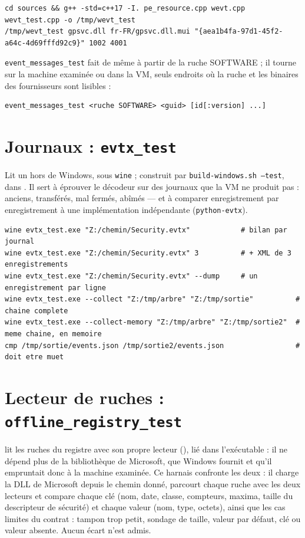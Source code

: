 \documentclass[11pt,a4paper,oneside]{report}
\begin{document}
\begin{lstlisting}
cd sources && g++ -std=c++17 -I. pe_resource.cpp wevt.cpp wevt_test.cpp -o /tmp/wevt_test
/tmp/wevt_test gpsvc.dll fr-FR/gpsvc.dll.mui "{aea1b4fa-97d1-45f2-a64c-4d69fffd92c9}" 1002 4001
\end{lstlisting}

\texttt{event\_messages\_test} fait de même à partir de la ruche SOFTWARE ; il
tourne sur la machine examinée ou dans la VM, seuls endroits où la ruche et les
binaires des fournisseurs sont lisibles :

\begin{lstlisting}
event_messages_test <ruche SOFTWARE> <guid> [id[:version] ...]
\end{lstlisting}

\section{Journaux : \texttt{evtx\_test}}

Lit un  hors de Windows, sous \texttt{wine} ; construit par
\texttt{build-windows.sh --test}, dans . Il sert à éprouver
le décodeur sur des journaux que la VM ne produit pas : anciens, transférés,
mal fermés, abîmés — et à comparer enregistrement par enregistrement à une
implémentation indépendante (\texttt{python-evtx}).

\begin{lstlisting}
wine evtx_test.exe "Z:/chemin/Security.evtx"            # bilan par journal
wine evtx_test.exe "Z:/chemin/Security.evtx" 3          # + XML de 3 enregistrements
wine evtx_test.exe "Z:/chemin/Security.evtx" --dump     # un enregistrement par ligne
wine evtx_test.exe --collect "Z:/tmp/arbre" "Z:/tmp/sortie"          # chaine complete
wine evtx_test.exe --collect-memory "Z:/tmp/arbre" "Z:/tmp/sortie2"  # meme chaine, en memoire
cmp /tmp/sortie/events.json /tmp/sortie2/events.json                 # doit etre muet
\end{lstlisting}


\section{Lecteur de ruches : \texttt{offline\_registry\_test}}

\wac{} lit les ruches du registre avec son propre lecteur
(), lié dans l'exécutable : il ne dépend plus
de la bibliothèque  de Microsoft, que Windows fournit et
qu'il empruntait donc à la machine examinée. Ce harnais confronte les deux :
il charge la DLL de Microsoft depuis le chemin donné, parcourt chaque ruche
avec les deux lecteurs et compare chaque clé (nom, date, classe, compteurs,
maxima, taille du descripteur de sécurité) et chaque valeur (nom, type,
octets), ainsi que les cas limites du contrat : tampon trop petit, sondage de
taille, valeur par défaut, clé ou valeur absente. Aucun écart n'est admis.
\end{document}
